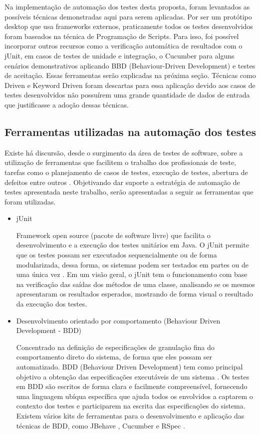 Na implementação de automação dos testes desta proposta, foram levantados as possíveis técnicas demonstradas aqui para serem aplicadas. Por ser um protótipo desktop que usa frameworks externos, praticamente todos os testes desenvolvidos foram baseados na técnica de Programação de Scripts. Para isso, foi possível incorporar outros recursos como a verificação automática de resultados com o jUnit, em casos de testes de unidade e integração, o Cucumber para alguns cenários demonstrativos aplicando BBD (Behaviour-Driven Development) e testes de aceitação. Essas ferramentas serão explicadas na próxima seção. Técnicas como Driven e Keyword Driven foram descartas para essa aplicação devido aos casos de testes desenvolvidos não possuírem uma grande quantidade de dados de entrada que justificasse a adoção dessas técnicas.

\subsection{Ferramentas utilizadas na automação dos testes}

Existe há discursão, desde o surgimento da área de testes de software, sobre a utilização de ferramentas que facilitem o trabalho dos profissionais de teste, tarefas como o planejamento de casos de testes, execução de testes, abertura de defeitos entre outros \cite{Solis2011}. Objetivando dar suporte a estratégia  de automação de testes apresentada neste trabalho, serão apresentadas a seguir as ferramentas que foram utilizadas.

\begin{itemize}

	\item  jUnit 

Framework open source (pacote de software livre) que facilita o desenvolvimento e a execução dos testes unitários em Java. O jUnit permite que os testes possam ser executados sequencialmente ou de forma modularizada, dessa forma, os sistemas podem ser testados em partes ou de uma única vez \cite{JUnit}. Em um visão geral, o jUnit tem o funcionamento com base na verificação das saídas dos métodos de uma classe, analisando se os mesmos apresentaram os resultados esperados, mostrando de forma visual o resultado da execução dos testes.
	
	\item Desenvolvimento orientado por comportamento (Behaviour Driven Development - BDD)
	
Concentrado na definição de especificações de granulação fina do comportamento direto do sistema, de forma que eles possam ser automatizado. BDD (Behaviour Driven Development) tem como principal objetivo a obtenção das especificações executáveis de um sistema \cite{Solis2011}. Os testes em BDD são escritos de forma clara e facilmente compreensível, fornecendo uma linguagem ubíqua específica que ajuda todos os envolvidos a captarem o contexto dos testes e participarem na escrita das especificações do sistema. Existem vários kits de ferramentas para o desenvolvimento e aplicação das técnicas de BDD, como JBehave \cite{JBehave}, Cucumber \cite{Cucumber} e RSpec \cite{RSpec}.

\end{itemize}

